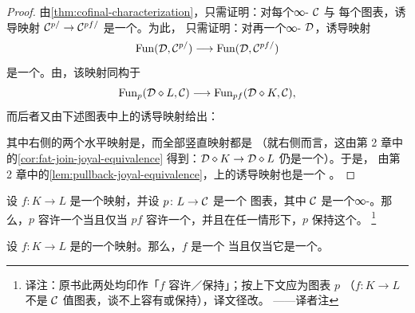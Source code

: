 \begin{proof}
由\cref{thm:cofinal-characterization}，只需证明：对每个∞-\trCategory{} $\mathcal{C}$ 与
每个图表，诱导映射 $\mathcal{C}^{p/} \to \mathcal{C}^{pf/}$ 是一个\trJoyalEquivalence{}。为此，
只需证明：对再一个∞-\trCategory{} $\mathcal{D}$，诱导映射
\[
\mathrm{Fun}(\mathcal{D}, \mathcal{C}^{p/}) \longrightarrow \mathrm{Fun}(\mathcal{D}, \mathcal{C}^{pf/})
\]
是一个\trEquivalence{}。由\trAdjunction{}，该映射同构于
\[
\mathrm{Fun}_p(\mathcal{D} \diamond L, \mathcal{C}) \longrightarrow
  \mathrm{Fun}_{pf}(\mathcal{D} \diamond K, \mathcal{C}),
\]
而后者又由下述图表中\trPullback{}上的诱导映射给出：
\begin{center}
\end{center}
其中右侧的两个水平映射是\trIsofibration{}，而全部竖直映射都是%
\trJoyalEquivalence{}（就右侧而言，这由第 2 章中的\cref{cor:fat-join-joyal-equivalence}
得到：$\mathcal{D} \diamond K \to \mathcal{D} \diamond L$ 仍是一个\trJoyalEquivalence{}）。于是，
由第 2 章中的\cref{lem:pullback-joyal-equivalence}，\trPullback{}上的诱导映射也是一个%
\trJoyalEquivalence{}。
\end{proof}

\begin{corollary}\label{cor:cofinal-colimit}
设 $f\colon K \to L$ 是一个\trCofinal{}映射，并设 $p\colon L \to \mathcal{C}$ 是一个%
图表，其中 $\mathcal{C}$ 是一个∞-\trCategory{}。那么，$p$ 容许一个\trColimit{}当且仅当
$pf$ 容许一个\trColimit{}，并且在任一情形下，$p$ 保持这个\trColimit{}。
\footnote{译注：原书此两处均印作「$f$ 容许／保持」；按上下文应为图表 $p$
（$f\colon K \to L$ 不是 $\mathcal{C}$ 值图表，谈不上容有或保持\trColimit{}），译文径改。
——译者注}
\end{corollary}

\begin{lemma}\label{lem:trivial-fibration-cofinal-right}
设 $f\colon K \to L$ 是\trSimplicialSets{}的一个映射。那么，$f$ 是一个%
\trTrivialFibration{}当且仅当它是一个\trCofinal{}\trRightFibration{}。
\end{lemma}

